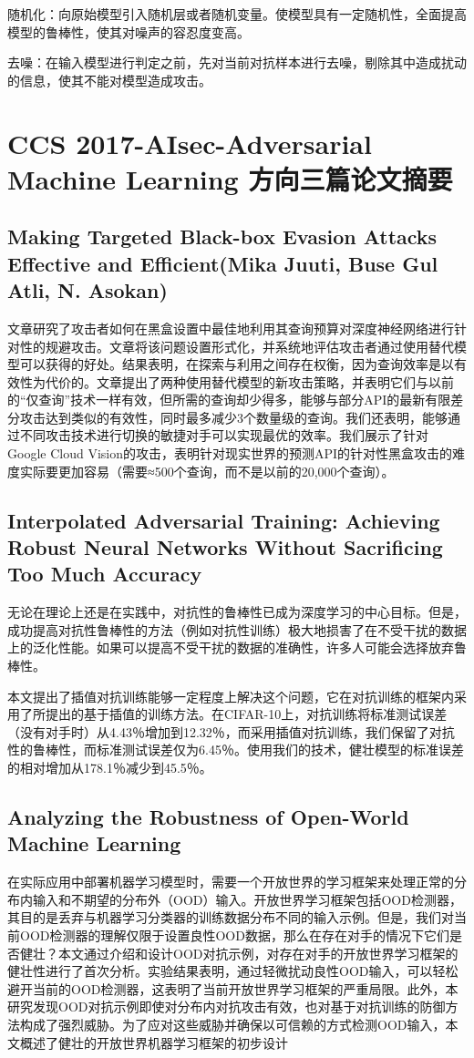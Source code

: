 \documentclass[UTF8]{ctexart}
\begin{document}
	随机化：向原始模型引入随机层或者随机变量。使模型具有一定随机性，全面提高模型的鲁棒性，使其对噪声的容忍度变高。

	去噪：在输入模型进行判定之前，先对当前对抗样本进行去噪，剔除其中造成扰动的信息，使其不能对模型造成攻击。
	\clearpage
	\section{CCS 2017-AIsec-Adversarial Machine Learning 方向三篇论文摘要}\label{sec:diwujie}
	\subsection{Making Targeted Black-box Evasion Attacks Effective and Efficient(Mika Juuti, Buse Gul Atli, N. Asokan)}
	文章研究了攻击者如何在黑盒设置中最佳地利用其查询预算对深度神经网络进行针对性的规避攻击。文章将该问题设置形式化，并系统地评估攻击者通过使用替代模型可以获得的好处。结果表明，在探索与利用之间存在权衡，因为查询效率是以有效性为代价的。文章提出了两种使用替代模型的新攻击策略，并表明它们与以前的“仅查询”技术一样有效，但所需的查询却少得多，能够与部分API的最新有限差分攻击达到类似的有效性，同时最多减少3个数量级的查询。我们还表明，能够通过不同攻击技术进行切换的敏捷对手可以实现最优的效率。我们展示了针对Google Cloud Vision的攻击，表明针对现实世界的预测API的针对性黑盒攻击的难度实际要更加容易（需要≈500个查询，而不是以前的20,000个查询）。
	\subsection{Interpolated Adversarial Training: Achieving Robust Neural Networks Without Sacrificing Too Much Accuracy}
	无论在理论上还是在实践中，对抗性的鲁棒性已成为深度学习的中心目标。但是，成功提高对抗性鲁棒性的方法（例如对抗性训练）极大地损害了在不受干扰的数据上的泛化性能。如果可以提高不受干扰的数据的准确性，许多人可能会选择放弃鲁棒性。

	本文提出了插值对抗训练能够一定程度上解决这个问题，它在对抗训练的框架内采用了所提出的基于插值的训练方法。在CIFAR-10上，对抗训练将标准测试误差（没有对手时）从4.43％增加到12.32％，而采用插值对抗训练，我们保留了对抗性的鲁棒性，而标准测试误差仅为6.45％。使用我们的技术，健壮模型的标准误差的相对增加从178.1％减少到45.5％。
	\subsection{Analyzing the Robustness of Open-World Machine Learning}
	在实际应用中部署机器学习模型时，需要一个开放世界的学习框架来处理正常的分布内输入和不期望的分布外（OOD）输入。开放世界学习框架包括OOD检测器，其目的是丢弃与机器学习分类器的训练数据分布不同的输入示例。但是，我们对当前OOD检测器的理解仅限于设置良性OOD数据，那么在存在对手的情况下它们是否健壮？本文通过介绍和设计OOD对抗示例，对存在对手的开放世界学习框架的健壮性进行了首次分析。实验结果表明，通过轻微扰动良性OOD输入，可以轻松避开当前的OOD检测器，这表明了当前开放世界学习框架的严重局限。此外，本研究发现OOD对抗示例即使对分布内对抗攻击有效，也对基于对抗训练的防御方法构成了强烈威胁。为了应对这些威胁并确保以可信赖的方式检测OOD输入，本文概述了健壮的开放世界机器学习框架的初步设计
\end{document}
